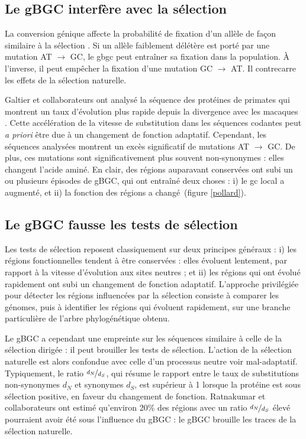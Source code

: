 \documentclass[11pt, oneside]{scrartcl}
\begin{document}
\subsection{Le gBGC interfère avec la sélection}
\label{sec:orgheadline15}
La conversion génique affecte la probabilité de fixation d'un allèle de façon
similaire à la sélection \cite{nagylaki_evolution_1983}. Si un allèle faiblement
délétère est porté par une mutation AT \(\rightarrow\) GC, le \ac{gbgc} peut
entraîner sa fixation dans la population. À l'inverse, il peut empêcher la
fixation d'une mutation GC \(\rightarrow\) AT. Il contrecarre les effets de la
sélection naturelle.

Galtier et collaborateurs ont analysé la séquence des protéines de primates qui
montrent un taux d'évolution plus rapide depuis la divergence avec les macaques
\cite{galtier_gc-biased_2009}. Cette accélération de la vitesse de substitution
dans les séquences codantes peut \emph{a priori} être due à un changement de fonction
adaptatif. Cependant, les séquences analysées montrent un excès significatif
de mutations AT \(\rightarrow\) GC. De plus, ces mutations sont significativement
plus souvent non-synonymes : elles changent l'acide aminé. En clair, des régions
auparavant conservées ont subi un ou plusieurs épisodes de gBGC, qui ont
entraîné deux choses : i) le \ac{gc} local a augmenté, et ii) la fonction des
régions a changé (figure \ref{pollard}).
\\

\subsection{Le gBGC fausse les tests de sélection}
\label{sec:orgheadline16}
Les tests de sélection reposent classiquement sur deux principes généraux
\cite{hurst_genetics_2009} : i) les régions fonctionnelles tendent à être
conservées : elles évoluent lentement, par rapport à la vitesse d'évolution aux
sites neutres ; et ii) les régions qui ont évolué rapidement ont subi un
changement de fonction adaptatif. L'approche privilégiée pour détecter les
régions influencées par la sélection consiste à comparer les génomes, puis à
identifier les régions qui évoluent rapidement, sur une branche particulière de
l'arbre phylogénétique obtenu\cite{ratnakumar_detecting_2010}.

Le gBGC a cependant une empreinte sur les séquences similaire à celle de la
sélection dirigée : il peut brouiller les tests de sélection. L'action de la
sélection naturelle est alors confondue avec celle d'un processus neutre voir
mal-adaptatif. Typiquement, le ratio \(\nicefrac{d_N}{d_S}\), qui résume le
rapport entre le taux de substitutions non-synonymes \(d_N\) et synonymes \(d_S\),
est supérieur à 1 lorsque la protéine est sous sélection positive, en faveur du
changement de fonction. Ratnakumar et collaborateurs ont estimé qu'environ 20\%
des régions avec un ratio \(\nicefrac{d_N}{d_S}\) élevé pourraient avoir été sous
l'influence du gBGC : le gBGC brouille les traces de la sélection naturelle.
\end{document}
